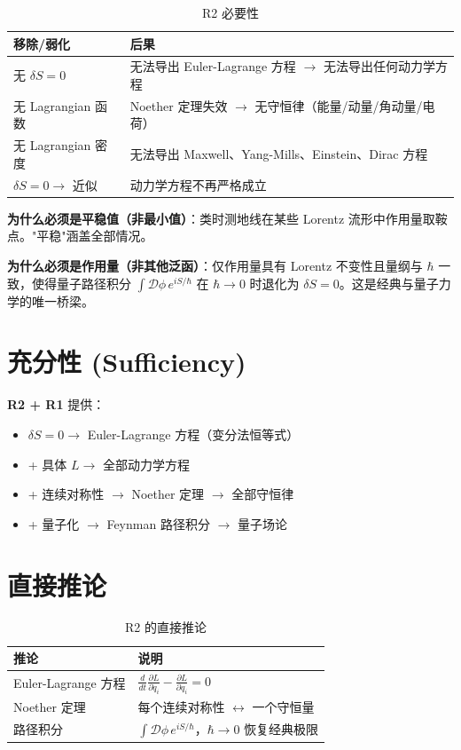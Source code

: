 \begin{table}[h]
\centering
\small
\begin{tabular}{p{5cm}p{7cm}}
\toprule
\textbf{移除/弱化} & \textbf{后果} \\
\midrule
无 $\delta S = 0$ & 无法导出 Euler-Lagrange 方程 $\to$ 无法导出任何动力学方程 \\
无 Lagrangian 函数 & Noether 定理失效 $\to$ 无守恒律（能量/动量/角动量/电荷） \\
无 Lagrangian 密度 & 无法导出 Maxwell、Yang-Mills、Einstein、Dirac 方程 \\
$\delta S = 0 \to$ 近似 & 动力学方程不再严格成立 \\
\bottomrule
\end{tabular}
\caption{R2 必要性}
\end{table}

\textbf{为什么必须是平稳值（非最小值）}：类时测地线在某些 Lorentz 流形中作用量取鞍点。"平稳"涵盖全部情况。

\textbf{为什么必须是作用量（非其他泛函）}：仅作用量具有 Lorentz 不变性且量纲与 $\hbar$ 一致，使得量子路径积分 $\int \mathcal{D}\phi\, e^{iS/\hbar}$ 在 $\hbar \to 0$ 时退化为 $\delta S = 0$。这是经典与量子力学的唯一桥梁。

\section{充分性 (Sufficiency)}

\textbf{R2 + R1} 提供：
\begin{itemize}
  \item $\delta S = 0 \to$ Euler-Lagrange 方程（变分法恒等式）
  \item + 具体 $L \to$ 全部动力学方程
  \item + 连续对称性 $\to$ Noether 定理 $\to$ 全部守恒律
  \item + 量子化 $\to$ Feynman 路径积分 $\to$ 量子场论
\end{itemize}

\section{直接推论}

\begin{table}[h]
\centering
\begin{tabular}{p{4cm}p{8cm}}
\toprule
\textbf{推论} & \textbf{说明} \\
\midrule
Euler-Lagrange 方程 & $\frac{d}{dt}\frac{\partial L}{\partial \dot{q}_i} - \frac{\partial L}{\partial q_i} = 0$ \\
Noether 定理 & 每个连续对称性 $\leftrightarrow$ 一个守恒量 \\
路径积分 & $\int \mathcal{D}\phi\, e^{iS/\hbar}$，$\hbar \to 0$ 恢复经典极限 \\
\bottomrule
\end{tabular}
\caption{R2 的直接推论}
\end{table}

